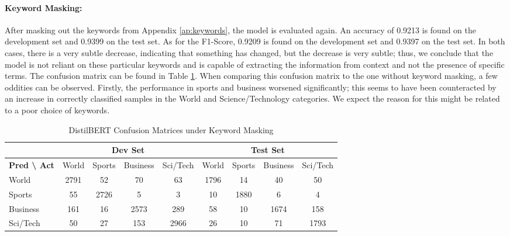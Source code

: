 \documentclass[12pt,a4paper,english]{article}
\begin{document}
\paragraph{Keyword Masking:} After masking out the keywords from Appendix \ref{ap:keywords}, the model is evaluated again. An accuracy of 0.9213 is found on the development set and 0.9399 on the test set. As for the F1-Score, 0.9209 is found on the development set and 0.9397 on the test set. In both cases, there is a very subtle decrease, indicating that something has changed, but the decrease is very subtle; thus, we conclude that the model is not reliant on these particular keywords and is capable of extracting the information from context and not the presence of specific terms. The confusion matrix can be found in Table \ref{tab:keyword_cm}. When comparing this confusion matrix to the one without keyword masking, a few oddities can be observed. Firstly, the performance in sports and business worsened significantly; this seems to have been counteracted by an increase in correctly classified samples in the World and Science/Technology categories. We expect the reason for this might be related to a poor choice of keywords. 

\begin{table}[h]
\centering
\begin{tabular}{|l|cccc|cccc|}
\hline
 & \multicolumn{4}{c|}{\textbf{Dev Set}} & \multicolumn{4}{c|}{\textbf{Test Set}} \\ \hline
\textbf{Pred \textbackslash{} Act} 
& World & Sports & Business & Sci/Tech 
& World & Sports & Business & Sci/Tech \\ \hline

World    
& 2791 & 52  & 70  & 63  
& 1796 & 14  & 40  & 50 \\

Sports   
& 55   & 2726& 5   & 3   
& 10   & 1880& 6   & 4  \\

Business 
& 161  & 16  & 2573& 289 
& 58   & 10  & 1674& 158\\

Sci/Tech 
& 50   & 27  & 153 & 2966
& 26   & 10  & 71  & 1793\\ \hline

\end{tabular}
\caption{DistilBERT Confusion Matrices under Keyword Masking}
\label{tab:keyword_cm}
\end{table}
\end{document}
